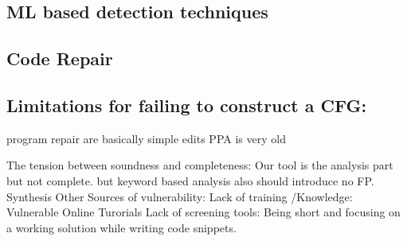 
\subsection{ML based detection techniques}
\subsection{Code Repair}
\subsection{Limitations for failing to construct a CFG:} program repair are basically simple edits
PPA is very old

The tension between soundness and completeness: 
Our tool is the analysis part but not complete. but keyword based analysis also should introduce no FP. 
Synthesis
Other Sources of vulnerability: 
Lack of training /Knowledge: Vulnerable Online Turorials 
Lack of screening tools:
Being short and focusing on a working solution while writing code snippets.
